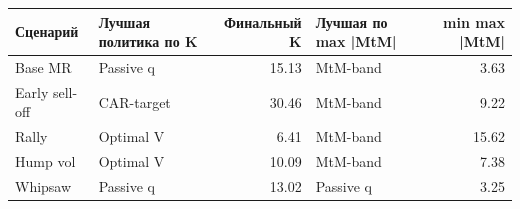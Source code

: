 \begin{tabular}{llrlr}
\toprule
Сценарий & Лучшая политика по K & Финальный K & Лучшая по max |MtM| & min max |MtM| \\
\midrule
Base MR & Passive q & 15.13 & MtM-band & 3.63 \\
Early sell-off & CAR-target & 30.46 & MtM-band & 9.22 \\
Rally & Optimal V & 6.41 & MtM-band & 15.62 \\
Hump vol & Optimal V & 10.09 & MtM-band & 7.38 \\
Whipsaw & Passive q & 13.02 & Passive q & 3.25 \\
\bottomrule
\end{tabular}
